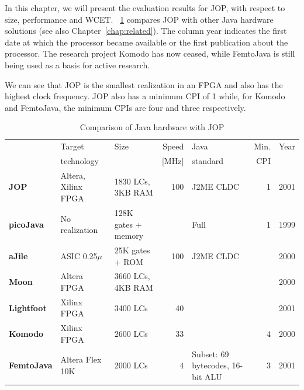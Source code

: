 %


In this chapter, we will present the evaluation results for JOP,
with respect to size, performance and WCET.
\tablename~\ref{tab_results_proc} compares JOP with other Java
hardware solutions (see also Chapter~\ref{chap:related}). The column
year indicates the first date at which the processor became
available or the first publication about the processor. The research
project Komodo has now ceased, while FemtoJava is still being used
as a basis for active research.

We can see that JOP is the smallest realization in an FPGA and also
has the highest clock frequency. JOP also has a minimum CPI of 1
while, for Komodo and FemtoJava, the minimum CPIs are four and three
respectively.

\begin{table}[tbh]
    \centering
{\footnotesize
\begin{tabular}
    {|>{\bfseries}m{1.6cm}|>{\raggedright}m{1.6cm}|>{\raggedright}m{1.7cm}|r|>{\raggedright}m{2cm}|r|r|}

    \hline
         & Target  & Size & Speed & Java     & Min.  & Year \\
         & technology &      & [MHz] & standard & CPI  & \\
    \hline
    JOP & Altera, Xilinx FPGA & 1830 LCs, 3KB RAM & 100 & J2ME CLDC & 1 & 2001 \\
    \hline
    picoJava & No realization & 128K gates + memory &  & Full & 1 & 1999 \\
    \hline
    aJile & ASIC 0.25$\mu$ & 25K gates + ROM & 100 & J2ME CLDC &  &  2000 \\
    \hline
    Moon & Altera FPGA & 3660 LCs, 4KB RAM &  &  &  &  2000 \\
    \hline
    Lightfoot & Xilinx FPGA & 3400 LCs & 40 &  &  &  2001 \\
    \hline
    Komodo & Xilinx FPGA & 2600 LCs & 33 & & 4 & 2000 \\
    \hline
    FemtoJava & Altera Flex 10K & 2000 LCs & 4 & Subset: 69 bytecodes, 16-bit ALU & 3  & 2001 \\
    \hline

\end{tabular}
}
    \caption{Comparison of Java hardware with JOP}
    \label{tab_results_proc}
\end{table}


